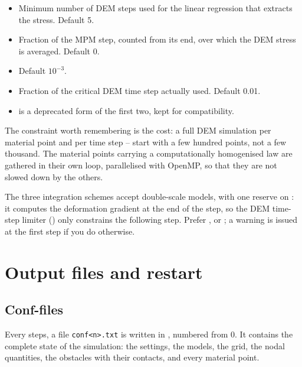 \documentclass[a4paper,onecolumn,11pt]{doofus}
\begin{document}
\begin{itemize}
\item {} Minimum number of DEM steps used
      for the linear regression that extracts the stress. Default 5.
\item {} Fraction of the MPM step,
      counted from its end, over which the DEM stress is averaged. Default 0.
\item {} Default $10^{-3}$.
\item {} Fraction of
      the critical DEM time step actually used. Default 0.01.
\item {}
      is a deprecated form of the first two, kept for compatibility.
\end{itemize}

The constraint worth remembering is the cost: a full DEM simulation per material point and
per time step -- start with a few hundred points, not a few thousand. The material points
carrying a computationally homogenised law are gathered in their own loop, parallelised
with OpenMP, so that they are not slowed down by the others.

The three integration schemes accept double-scale models, with one reserve on
: it computes the deformation gradient at the end of the step, so
the DEM time-step limiter () only constrains the following
step. Prefer , or ; a warning is
issued at the first step if you do otherwise.


\section{Output files and restart}
\label{sec:outputs}

\subsection{Conf-files}
\label{sec:conffiles}

Every  steps, a file \texttt{conf<n>.txt} is written in
, numbered from 0. It contains the complete state of the simulation:
the settings, the models, the grid, the nodal quantities, the obstacles with their contacts,
and every material point.
\end{document}
